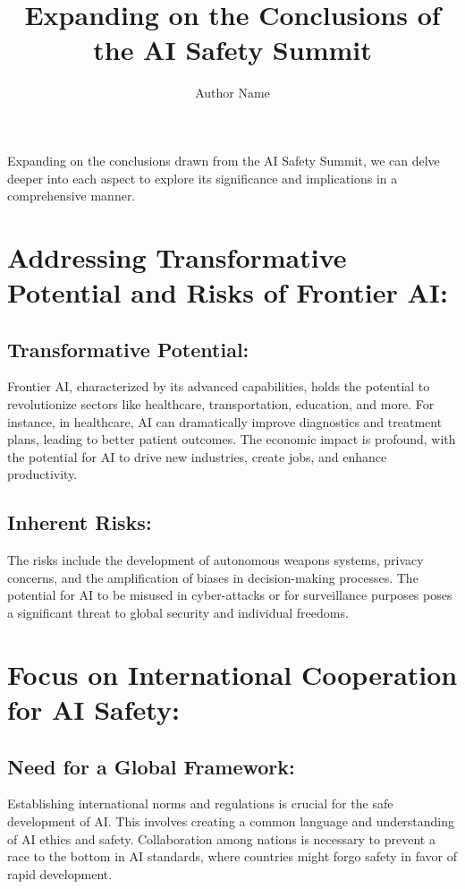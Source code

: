 \documentclass{article}
\title{Expanding on the Conclusions of the AI Safety Summit}
\author{Author Name}
\begin{document}
\maketitle

Expanding on the conclusions drawn from the AI Safety Summit, we can delve deeper into each aspect to explore its significance and implications in a comprehensive manner.

\section{Addressing Transformative Potential and Risks of Frontier AI:}
\subsection{Transformative Potential:}
Frontier AI, characterized by its advanced capabilities, holds the potential to revolutionize sectors like healthcare, transportation, education, and more. For instance, in healthcare, AI can dramatically improve diagnostics and treatment plans, leading to better patient outcomes. The economic impact is profound, with the potential for AI to drive new industries, create jobs, and enhance productivity.

\subsection{Inherent Risks:}
The risks include the development of autonomous weapons systems, privacy concerns, and the amplification of biases in decision-making processes. The potential for AI to be misused in cyber-attacks or for surveillance purposes poses a significant threat to global security and individual freedoms.

\section{Focus on International Cooperation for AI Safety:}
\subsection{Need for a Global Framework:}
Establishing international norms and regulations is crucial for the safe development of AI. This involves creating a common language and understanding of AI ethics and safety. Collaboration among nations is necessary to prevent a race to the bottom in AI standards, where countries might forgo safety in favor of rapid development.
\end{document}
